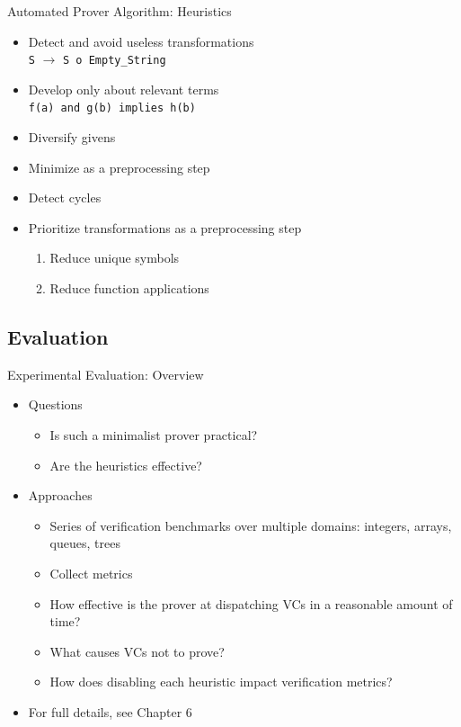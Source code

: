 \begin{frame}{Automated Prover Algorithm: Heuristics}
	\begin{itemize}
		\item Detect and avoid useless transformations\\
			\texttt{S} $\rightarrow$ \texttt{S o Empty\_String}
		\item Develop only about relevant terms\\
			\texttt{f(a) and g(b) implies h(b)}
		\item Diversify givens
		\item Minimize as a preprocessing step
		\item Detect cycles
		\item Prioritize transformations as a preprocessing step\\
			\begin{enumerate}
				\item Reduce unique symbols
				\item Reduce function applications
			\end{enumerate}
	\end{itemize}
\end{frame}


\subsection{Evaluation}
\begin{frame}{Experimental Evaluation: Overview}
	\begin{itemize}
		\item Questions\\
		\begin{itemize}
			\item Is such a minimalist prover practical?
			\item Are the heuristics effective?
		\end{itemize}
		\item Approaches\\
		\begin{itemize}
			\item Series of verification benchmarks over multiple domains: integers, arrays, queues, trees
			\item Collect metrics
			\item How effective is the prover at dispatching VCs in a reasonable amount of time?
			\item What causes VCs not to prove?
			\item How does disabling each heuristic impact verification metrics?
		\end{itemize}
		\item For full details, see Chapter 6
	\end{itemize}
\end{frame}


